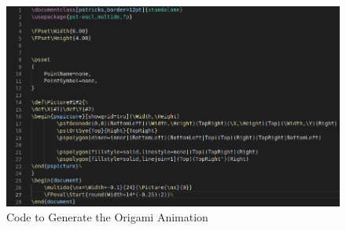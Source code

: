 \documentclass{article}
\begin{document}
        \begin{figure}[h!]
            \centering
            \includegraphics[width=1\textwidth]{origami.png}
            \caption{Code to Generate the Origami Animation}
        \end{figure}
\end{document}
